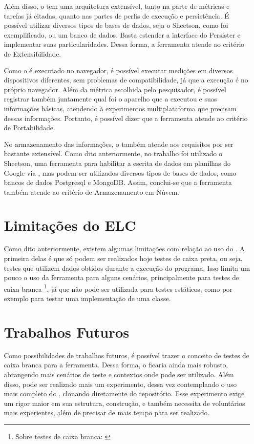 \documentclass[12pt]{tcc}
\begin{document}
	Além disso, o  tem uma arquitetura extensível, tanto na parte de métricas e tarefas já citadas, quanto nas partes de perfis de execução e persistência. É possível utilizar diversos tipos de bases de dados, seja o Sheetson, como foi exemplificado, ou um banco de dados. Basta estender a interface do Persister e implementar suas particularidades. Dessa forma, a ferramenta atende ao critério de Extensibilidade.

	Como o  é executado no navegador, é possível executar medições em diversos dispositivos diferentes, sem problemas de compatibilidade, já que a execução é no próprio navegador. Além da métrica escolhida pelo pesquisador, é possível registrar também juntamente qual foi o aparelho que a executou e suas informações básicas, atendendo à experimentos multiplataforma que precisam dessas informações. Portanto, é possível dizer que a ferramenta atende ao critério de Portabilidade.

	No armazenamento das informações, o  também atende aos requisitos por ser bastante extensível. Como dito anteriormente, no trabalho foi utilizado o Sheetson, uma ferramenta para habilitar a escrita de dados em planilhas do Google via , mas podem ser utilizados diversos tipos de bases de dados, como bancos de dados Postgresql e MongoDB. Assim, conclui-se que a ferramenta também atende ao critério de Armazenamento em Núvem.


	\section{Limitações do ELC}
	\label{section:limitacoes-elc}

	Como dito anteriormente, existem algumas limitações com relação ao uso do . A primeira delas é que só podem ser realizados hoje testes de caixa preta, ou seja, testes que utilizem dados obtidos durante a execução do programa. Isso limita um pouco o uso da ferramenta para alguns cenários, principalmente para testes de caixa branca \footnote{Sobre testes de caixa branca: \citep[Capítulo 21]{Sommerville2015Software}}, já que não pode ser utilizada para testes estáticos, como por exemplo para testar uma implementação de uma classe.

	\section{Trabalhos Futuros}
	\label{section:trabalhos-futuros}

	Como possibilidades de trabalhos futuros, é possível trazer o conceito de testes de caixa branca para a ferramenta. Dessa forma, o  ficaria ainda mais robusto, abrangendo mais cenários de teste e contextos onde pode ser utilizado. Além disso, pode ser realizado mais um experimento, dessa vez contemplando o uso mais completo do , clonando diretamente do repositório. Esse experimento exige um rigor maior em sua estrutura, construção, e também necessita de voluntários mais experientes, além de precisar de mais tempo para ser realizado.
\end{document}
